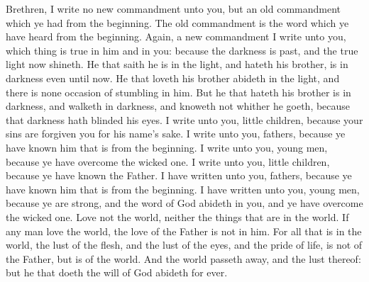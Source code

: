  Brethren, I write no new commandment unto you, but an old
commandment which ye had from the beginning. The old commandment is the
word which ye have heard from the beginning.  Again, a new
commandment I write unto you, which thing is true in him and in you:
because the darkness is past, and the true light now shineth.
 He that saith he is in the light, and hateth his brother,
is in darkness even until now.  He that loveth his brother
abideth in the light, and there is none occasion of stumbling in him.
 But he that hateth his brother is in darkness, and walketh
in darkness, and knoweth not whither he goeth, because that darkness
hath blinded his eyes.  I write unto you, little children,
because your sins are forgiven you for his name's sake.  I
write unto you, fathers, because ye have known him that is from the
beginning. I write unto you, young men, because ye have overcome the
wicked one. I write unto you, little children, because ye have known the
Father.  I have written unto you, fathers, because ye have
known him that is from the beginning. I have written unto you, young
men, because ye are strong, and the word of God abideth in you, and ye
have overcome the wicked one.  Love not the world, neither
the things that are in the world. If any man love the world, the love of
the Father is not in him.  For all that is in the world,
the lust of the flesh, and the lust of the eyes, and the pride of life,
is not of the Father, but is of the world.  And the world
passeth away, and the lust thereof: but he that doeth the will of God
abideth for ever.

